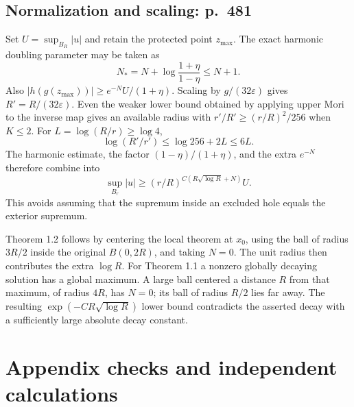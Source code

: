 \documentclass[10pt]{article}
\begin{document}
\subsection*{Normalization and scaling: p. 481}
Set \(U=\sup_{B_R}|u|\) and retain the protected point \(z_{\max}\). The exact harmonic doubling parameter may be taken as \[N_*=N+\log\frac{1+\eta}{1-\eta}\le N+1.\] Also \(|h(g(z_{\max}))|\ge e^{-N}U/(1+\eta)\). Scaling by \(g/(32\varepsilon)\) gives \(R'=R/(32\varepsilon)\). Even the weaker lower bound obtained by applying upper Mori to the inverse map gives an available radius with \(r'/R'\ge (r/R)^2/256\) when \(K\le2\). For \(L=\log(R/r)\ge\log4\), \[\log(R'/r')\le\log256+2L\le6L.\] The harmonic estimate, the factor \((1-\eta)/(1+\eta)\), and the extra \(e^{-N}\) therefore combine into \[\sup_{B_r}|u|\ge(r/R)^{C(R\sqrt{\log R}+N)}U.\] This avoids assuming that the supremum inside an excluded hole equals the exterior supremum.\par
Theorem 1.2 follows by centering the local theorem at \(x_0\), using the ball of radius \(3R/2\) inside the original \(B(0,2R)\), and taking \(N=0\). The unit radius then contributes the extra \(\log R\). For Theorem 1.1 a nonzero globally decaying solution has a global maximum. A large ball centered a distance \(R\) from that maximum, of radius \(4R\), has \(N=0\); its ball of radius \(R/2\) lies far away. The resulting \(\exp(-CR\sqrt{\log R})\) lower bound contradicts the asserted decay with a sufficiently large absolute decay constant.\par
\section*{Appendix checks and independent calculations}
\end{document}
